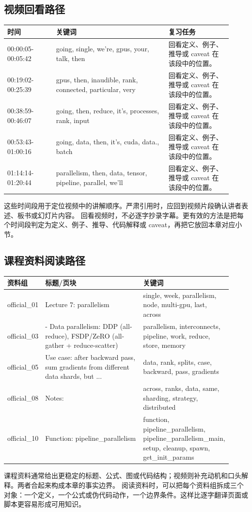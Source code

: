 \documentclass[a4paper]{article}
\begin{document}
\subsection{视频回看路径}
\begin{longtable}{p{0.20\linewidth}p{0.46\linewidth}p{0.26\linewidth}}
\toprule
\textbf{时间} & \textbf{关键词} & \textbf{复习任务}\\
\midrule
00:00:05-00:05:42 & going, single, we're, gpus, your, talk, then & 回看定义、例子、推导或 caveat 在该段中的位置。\\
00:19:02-00:25:39 & gpus, then, inaudible, rank, connected, particular, very & 回看定义、例子、推导或 caveat 在该段中的位置。\\
00:38:59-00:46:07 & going, then, reduce, it's, processes, rank, input & 回看定义、例子、推导或 caveat 在该段中的位置。\\
00:53:43-01:00:16 & going, data, then, it's, cuda, data., batch & 回看定义、例子、推导或 caveat 在该段中的位置。\\
01:14:14-01:20:44 & parallelism, then, data, tensor, pipeline, parallel, we'll & 回看定义、例子、推导或 caveat 在该段中的位置。\\
\bottomrule
\end{longtable}
这些时间段用于定位视频中的讲解顺序。严肃引用时，应回到视频片段确认讲者表述、板书或幻灯片内容。
回看视频时，不必逐字抄录字幕。更有效的方法是把每个时间段判定为定义、例子、推导、代码解释或 caveat，再把它放回本章对应小节。
\subsection{课程资料阅读路径}
\begin{longtable}{p{0.14\linewidth}p{0.48\linewidth}p{0.30\linewidth}}
\toprule
\textbf{资料组} & \textbf{标题/页块} & \textbf{关键词}\\
\midrule
official\_01 & Lecture 7: parallelism & single, week, parallelism, node, multi-gpu, last, across\\
official\_03 & - Data parallelism: DDP (all-reduce), FSDP/ZeRO (all-gather + reduce-scatter) & parallelism, interconnects, pipeline, work, reduce, store, memory\\
official\_05 & Use case: after backward pass, sum gradients from different data shards, but ... & data, rank, splits, case, backward, pass, gradients\\
official\_08 & Notes: & across, ranks, data, same, sharding, strategy, distributed\\
official\_10 & Function: pipeline\_parallelism & function, pipeline\_parallelism, pipeline\_parallelism\_main, setup, cleanup, spawn, get\_init\_params\\
\bottomrule
\end{longtable}
课程资料通常给出更稳定的标题、公式、图或代码结构；视频则补充动机和口头解释。两者合起来构成本章的事实边界。
阅读资料时，可以把每个资料组拆成三个对象：一个定义，一个公式或伪代码动作，一个边界条件。这样比逐字翻译页面或脚本更容易形成可用知识。
\end{document}

